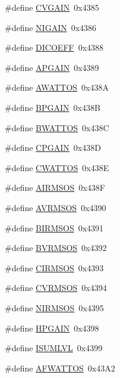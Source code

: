 \begin{DoxyCompactItemize}
\item 
\#define \hyperlink{a00036_a0920d5a91a9a5a8339d894c00cfecec7}{C\-V\-G\-A\-I\-N}~0x4385
\item 
\#define \hyperlink{a00036_af07e2afa008b4d5feb6f637e13865b77}{N\-I\-G\-A\-I\-N}~0x4386
\item 
\#define \hyperlink{a00036_a368be558deaf920bc0805191b5fc737e}{D\-I\-C\-O\-E\-F\-F}~0x4388
\item 
\#define \hyperlink{a00036_aec3a4133dfcfd773f10ad6d693e593f6}{A\-P\-G\-A\-I\-N}~0x4389
\item 
\#define \hyperlink{a00036_a473d84b2550fdf5e0c68a8f27e1a3c53}{A\-W\-A\-T\-T\-O\-S}~0x438\-A
\item 
\#define \hyperlink{a00036_a5d52d416295c400f6eb84bdbcc834560}{B\-P\-G\-A\-I\-N}~0x438\-B
\item 
\#define \hyperlink{a00036_a9c20ee65c3ba9c0fc123fc2a262d02e7}{B\-W\-A\-T\-T\-O\-S}~0x438\-C
\item 
\#define \hyperlink{a00036_aa3cfe8257b2ce2609bc10431cf461e2c}{C\-P\-G\-A\-I\-N}~0x438\-D
\item 
\#define \hyperlink{a00036_adefc91120b39bde4d31d7f685c834d1c}{C\-W\-A\-T\-T\-O\-S}~0x438\-E
\item 
\#define \hyperlink{a00036_a41b8ebb861316f604138d43b9e9fd306}{A\-I\-R\-M\-S\-O\-S}~0x438\-F
\item 
\#define \hyperlink{a00036_ac77c2a7c4fa3473fb51e9f62a9df39e1}{A\-V\-R\-M\-S\-O\-S}~0x4390
\item 
\#define \hyperlink{a00036_a12ec7e610dfabea2ef50a9078a6f48eb}{B\-I\-R\-M\-S\-O\-S}~0x4391
\item 
\#define \hyperlink{a00036_a82b0238744da6064813d1974735bc64c}{B\-V\-R\-M\-S\-O\-S}~0x4392
\item 
\#define \hyperlink{a00036_aff79e00cb47bdd946aaf31c86bfb337c}{C\-I\-R\-M\-S\-O\-S}~0x4393
\item 
\#define \hyperlink{a00036_a6e1bda3d471c0ed3ef337b2f5f1ee9d5}{C\-V\-R\-M\-S\-O\-S}~0x4394
\item 
\#define \hyperlink{a00036_a044389a99da8b8ab9f1e67b05ba0c5ef}{N\-I\-R\-M\-S\-O\-S}~0x4395
\item 
\#define \hyperlink{a00036_a8ccbfb7b68b73c3cc9aef1886209df0f}{H\-P\-G\-A\-I\-N}~0x4398
\item 
\#define \hyperlink{a00036_a0215d6d8187642f8789c19422210c3eb}{I\-S\-U\-M\-L\-V\-L}~0x4399
\item 
\#define \hyperlink{a00036_a2037a4c64099cc2241d21cb82d8a3c89}{A\-F\-W\-A\-T\-T\-O\-S}~0x43\-A2

\end{DoxyCompactItemize}
